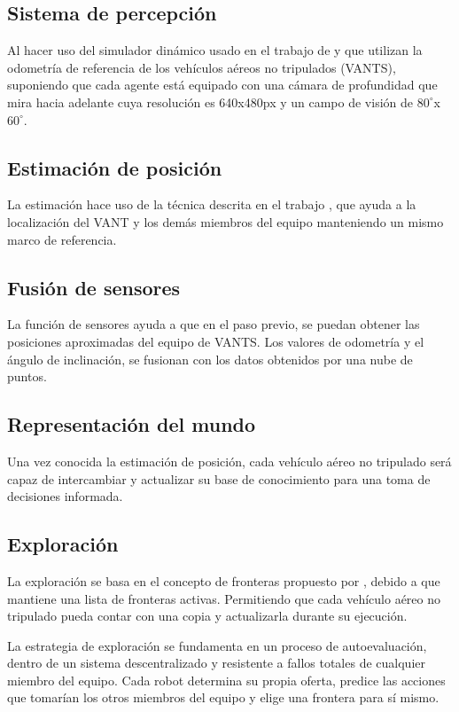 \subsection*{Sistema de percepción}

Al hacer uso del simulador dinámico usado en el trabajo de \citeauthor{RACER2022} y \citeauthor{BARTOLOMEI2023} que utilizan la odometría de referencia de los vehículos aéreos no tripulados (VANTS), suponiendo que cada agente está equipado con una cámara de profundidad que mira hacia adelante cuya resolución es 640x480px y un campo de visión de $80^{\circ}$x$60^{\circ}$.


\subsection*{Estimación de posición}
La estimación hace uso de la técnica descrita en el trabajo \citeauthor{OMNI2022}, que ayuda a la localización del VANT y los demás miembros del equipo manteniendo un mismo marco de referencia.

\subsection*{Fusión de sensores}
La función de sensores ayuda a que en el paso previo, se puedan obtener las posiciones aproximadas del equipo de VANTS. Los valores de odometría y el ángulo de inclinación, se fusionan con los datos obtenidos por una nube de puntos.

\subsection*{Representación del mundo}
Una vez conocida la estimación de posición, cada vehículo aéreo no tripulado será capaz de intercambiar y actualizar su base de conocimiento para una toma de decisiones informada.

\subsection*{Exploración}
La exploración se basa en el concepto de fronteras propuesto por \citeauthor{YAMAUCHI1997}, debido a que mantiene una lista de fronteras activas. Permitiendo que cada vehículo aéreo no tripulado pueda contar con una copia y actualizarla durante su ejecución.

La estrategia de exploración se fundamenta en un proceso de autoevaluación, dentro de un sistema descentralizado y resistente a fallos totales de cualquier miembro del equipo. Cada robot determina su propia oferta, predice las acciones que tomarían los otros miembros del equipo y elige una frontera para sí mismo. \cite{CINVESTAM2013}

